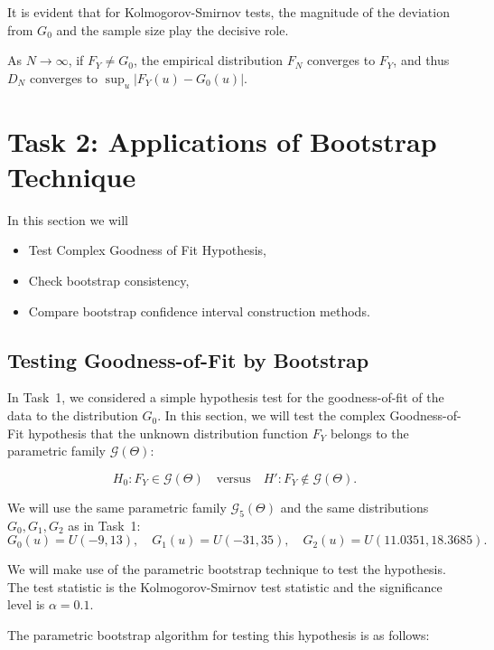\documentclass{article}
\begin{document}
It is evident that for Kolmogorov-Smirnov tests, the magnitude of the deviation from \(G_0\) and the sample size play the decisive role.

As \(N \to \infty\), if \(F_Y \neq G_0\), the empirical distribution \(F_N\) converges to \(F_Y\), and thus \(D_N\) converges to \(\sup_u |F_Y(u)-G_0(u)|\).

\section{Task 2: Applications of Bootstrap Technique}

In this section we will

\begin{itemize}
    \item Test Complex Goodness of Fit Hypothesis,
    \item Check bootstrap consistency,
    \item Compare bootstrap confidence interval construction methods.
\end{itemize}

\subsection{Testing Goodness-of-Fit by Bootstrap}

In Task~1, we considered a simple hypothesis test for the goodness-of-fit of the data to the distribution \(G_0\). In this section, we will test the complex Goodness-of-Fit hypothesis that the unknown distribution function \(F_Y\) belongs to the parametric family \(\mathcal{G}(\Theta)\):

\[
  H_0: F_Y \in \mathcal{G}(\Theta)
  \quad\text{versus}\quad
  H': F_Y \notin \mathcal{G}(\Theta).
\]

We will use the same parametric family \(\mathcal{G}_5(\Theta)\) and the same distributions \(G_0, G_1, G_2\) as in Task~1:
\[
    G_0(u) = U(-9, 13), \quad G_1(u) = U(-31, 35), \quad G_2(u) = U(11.0351, 18.3685).
\]

We will make use of the parametric bootstrap technique to test the hypothesis. The test statistic is the Kolmogorov-Smirnov test statistic and the significance level is \(\alpha = 0.1\).

The parametric bootstrap algorithm for testing this hypothesis is as follows:
\end{document}
